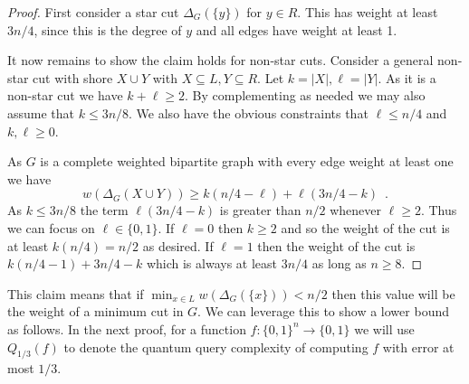 \begin{proof}
First consider a star cut $\Delta_G(\{y\})$ for $y \in R$.  This has weight at least $3n/4$, since this is the degree of $y$ and all edges have weight at least 1.  

It now remains to show the claim holds for non-star cuts.  Consider a general non-star cut with shore $X \cup Y$ with $X \subseteq L, Y \subseteq R$.  Let 
$k = |X|, \ell = |Y|$.  As it is a non-star cut we have $k + \ell \ge 2$.  By complementing as needed we may also assume that $k \le 3n/8$.  We also have 
the obvious constraints that $\ell \le n/4$ and $k,\ell \ge 0$.  

As $G$ is a complete weighted bipartite graph with every edge weight at least one we have
\[
w(\Delta_G(X \cup Y)) \ge k(n/4-\ell) + \ell(3n/4-k) \enspace .
\]
As $k \le 3n/8$ the term $\ell (3n/4-k)$ is greater than $n/2$ whenever $\ell \ge 2$.  Thus we can focus on $\ell \in \{0,1\}$.  
If $\ell=0$ then $k\ge 2$ and so the weight of the cut is at least $k(n/4)=n/2$ as desired.  If $\ell = 1$ then the weight of the 
cut is $k(n/4-1) + 3n/4-k$ which is always at least $3n/4$ as long as $n \ge 8$.  
\end{proof}

This claim means that if $\min_{x \in L} w(\Delta_G(\{x\})) < n/2$ then this value will be the weight of a minimum cut in $G$.  
We can leverage this to show a lower bound as follows.
In the next proof, for a function $f: \{0,1\}^n \rightarrow \{0,1\}$ we will use $Q_{1/3}(f)$ to denote the quantum query complexity of computing $f$ with error at most $1/3$.
